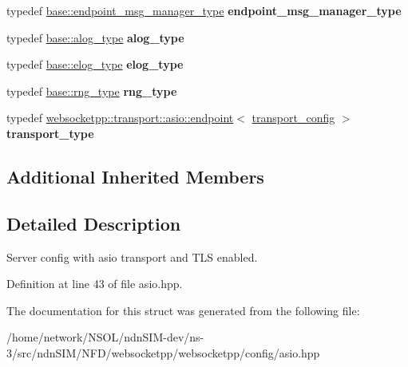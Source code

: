 \begin{DoxyCompactItemize}
\item 
typedef \hyperlink{classwebsocketpp_1_1message__buffer_1_1alloc_1_1endpoint__msg__manager}{base\+::endpoint\+\_\+msg\+\_\+manager\+\_\+type} {\bfseries endpoint\+\_\+msg\+\_\+manager\+\_\+type}\hypertarget{structwebsocketpp_1_1config_1_1asio__tls_a7fdb90dbe56e52adc2d99e38d4fc626d}{}\label{structwebsocketpp_1_1config_1_1asio__tls_a7fdb90dbe56e52adc2d99e38d4fc626d}

\item 
typedef \hyperlink{classwebsocketpp_1_1log_1_1basic}{base\+::alog\+\_\+type} {\bfseries alog\+\_\+type}\hypertarget{structwebsocketpp_1_1config_1_1asio__tls_a27fcf6498be1a6ab0e81ea117b5a9903}{}\label{structwebsocketpp_1_1config_1_1asio__tls_a27fcf6498be1a6ab0e81ea117b5a9903}

\item 
typedef \hyperlink{structwebsocketpp_1_1config_1_1core_ac037ffb73b675a6251f3b86433b4eb17}{base\+::elog\+\_\+type} {\bfseries elog\+\_\+type}\hypertarget{structwebsocketpp_1_1config_1_1asio__tls_a81b08cb436d7666730391fc9f3c73de7}{}\label{structwebsocketpp_1_1config_1_1asio__tls_a81b08cb436d7666730391fc9f3c73de7}

\item 
typedef \hyperlink{structwebsocketpp_1_1config_1_1core_a245db33d05f7994d221db66f506ab8c6}{base\+::rng\+\_\+type} {\bfseries rng\+\_\+type}\hypertarget{structwebsocketpp_1_1config_1_1asio__tls_a4d32d1651cb937c392c4eed71034752e}{}\label{structwebsocketpp_1_1config_1_1asio__tls_a4d32d1651cb937c392c4eed71034752e}

\item 
typedef \hyperlink{classwebsocketpp_1_1transport_1_1asio_1_1endpoint}{websocketpp\+::transport\+::asio\+::endpoint}$<$ \hyperlink{structwebsocketpp_1_1config_1_1asio__tls_1_1transport__config}{transport\+\_\+config} $>$ {\bfseries transport\+\_\+type}\hypertarget{structwebsocketpp_1_1config_1_1asio__tls_ad261981514a31011420d9191ff9b80a8}{}\label{structwebsocketpp_1_1config_1_1asio__tls_ad261981514a31011420d9191ff9b80a8}

\end{DoxyCompactItemize}
\subsection*{Additional Inherited Members}


\subsection{Detailed Description}
Server config with asio transport and T\+LS enabled. 

Definition at line 43 of file asio.\+hpp.



The documentation for this struct was generated from the following file\+:\begin{DoxyCompactItemize}
\item 
/home/network/\+N\+S\+O\+L/ndn\+S\+I\+M-\/dev/ns-\/3/src/ndn\+S\+I\+M/\+N\+F\+D/websocketpp/websocketpp/config/asio.\+hpp\end{DoxyCompactItemize}
